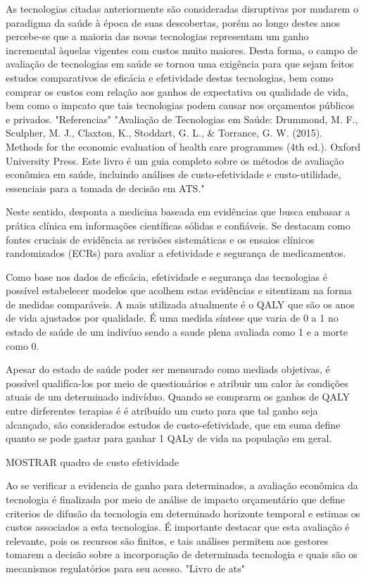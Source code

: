 \documentclass[article,a4paper,12pt,brazil,sumario=tradicional]{abntex2}
\begin{document}
As tecnologias citadas anteriormente são consideradas disruptivas por mudarem o paradigma da saúde à época de suas descobertas, porém ao longo destes anos percebe-se que a maioria das novas tecnologias representam um ganho incremental àquelas vigentes com custos muito maiores. Desta forma, o campo de avaliação de tecnologias em saúde se tornou uma exigência para que sejam feitos estudos comparativos de eficácia e efetividade destas tecnologias, bem como comprar os custos com relação aos ganhos de expectativa ou qualidade de vida, bem como o impcato que tais tecnologias podem causar nos orçamentos públicos e privados.
"Referencias"
"Avaliação de Tecnologias em Saúde: Drummond, M. F., Sculpher, M. J., Claxton, K., Stoddart, G. L., & Torrance, G. W. (2015). Methods for the economic evaluation of health care programmes (4th ed.). Oxford University Press. Este livro é um guia completo sobre os métodos de avaliação econômica em saúde, incluindo análises de custo-efetividade e custo-utilidade, essenciais para a tomada de decisão em ATS."

Neste sentido, desponta a medicina baseada em evidências que busca embasar a prática clínica em informações científicas sólidas e confiáveis. Se destacam como fontes cruciais de evidência as revisões sistemáticas e os ensaios clínicos randomizados (ECRs) para avaliar a efetividade e segurança de medicamentos.

Como base nos dados de eficácia, efetividade e segurança das tecnologias é possível estabelecer modelos que acolhem estas evidências e sitentizam na forma de medidas comparáveis. A mais utilizada atualmente é o QALY que são os anos de vida ajustados por qualidade. É uma medida síntese que varia de 0 a 1 no estado de saúde de um indivíuo sendo a saude plena avaliada como 1 e a morte como 0. 

Apesar do estado de saúde poder ser mensurado como mediads objetivas, é possível qualifíca-los por meio de questionários e atribuir um calor às condições atuais de um determinado indivíduo. Quando se comprarm os ganhos de QALY entre dirferentes terapias é é atribuído um custo para que tal ganho seja alcançado, são considerados estudos de custo-efetividade, que em suma define quanto se pode gastar para ganhar 1 QALy de vida na população em geral.

MOSTRAR quadro de custo efetividade

Ao se verificar a evidencia de ganho para determinados, a avaliação econômica da tecnologia é finalizada por meio de análise de impacto orçamentário que define criterios de difusão da tecnologia em determinado horizonte temporal e estimas os custos associados a esta tecnologias. É importante destacar que esta avaliação é relevante, pois os recursos são finitos, e tais análises permitem aos gestores tomarem a decisão sobre a incorporação de determinada tecnologia e quais são os mecanismos regulatórios para seu acesso.
"Livro de ats"
\end{document}
